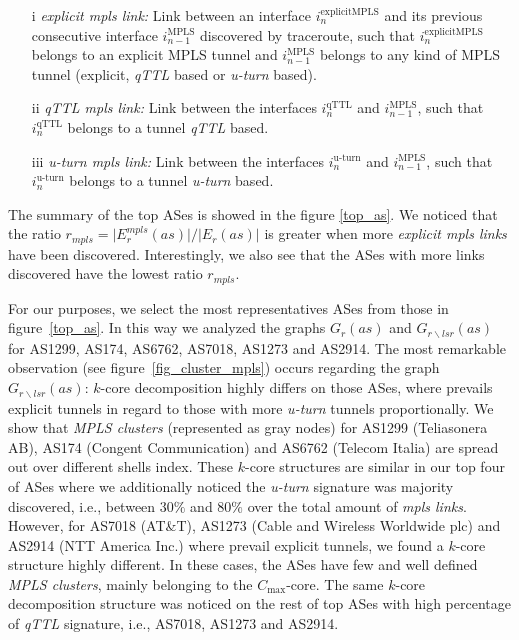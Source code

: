 \begin{itemize}
\item[i] \textit{explicit mpls link:} Link between an interface $i^{\text{explicitMPLS}}_{n}$  and its previous consecutive interface $i^{\text{MPLS}}_{n-1}$ discovered by traceroute, such that $i^{\text{explicitMPLS}}_{n}$ belongs to an explicit MPLS tunnel and $i^{\text{MPLS}}_{n-1}$ belongs to any kind of MPLS tunnel (explicit, \textit{qTTL} based or \textit{u-turn} based).

\item[ii] \textit{qTTL mpls link:} Link between the interfaces $i^{\text{qTTL}}_{n}$  and $i^{\text{MPLS}}_{n-1}$, such that $i^{\text{qTTL}}_{n}$ belongs to a tunnel \textit{qTTL} based.

\item[iii] \textit{u-turn mpls link:} Link between the interfaces $i^{\text{u-turn}}_{n}$  and $i^{\text{MPLS}}_{n-1}$, such that $i^{\text{u-turn}}_{n}$ belongs to a tunnel \textit{u-turn} based.

\end{itemize}

The summary of the top ASes is showed in the figure \ref{top_as}. 
We noticed that the ratio $r_{mpls}= \vert E^{mpls}_{r} (as) \vert /\vert E_{r} (as) \vert $  is greater when more  \textit{explicit mpls links} have been discovered. 
Interestingly, we also see that the ASes with more links discovered have the lowest ratio $r_{mpls}$. 

For our purposes, we select the most representatives ASes from those in figure~\ref{top_as}.
In this way we analyzed the graphs $G_{r}(as)$ and $G_{r\backslash lsr}(as)$ for AS1299, AS174, AS6762, AS7018, AS1273 and AS2914. 
The most remarkable observation (see figure~\ref{fig_cluster_mpls}) occurs regarding the graph $G_{r\backslash lsr}(as)$: $k$-core decomposition highly differs on those ASes, where prevails explicit tunnels in regard to those with more \textit{u-turn} tunnels proportionally. 
We show that \textit{MPLS clusters} (represented as gray nodes) for  AS1299 (Teliasonera AB), AS174 (Congent Communication) and AS6762 (Telecom Italia) are spread out over different shells index. 
These $k$-core structures are similar in our top four of ASes where we additionally noticed  the \textit{u-turn} signature was majority discovered, i.e., between $30\%$ and  $80\%$ over  the total amount of \textit{mpls links}. 
However, for AS7018 (AT\&T), AS1273 (Cable and Wireless Worldwide plc) and AS2914 (NTT America Inc.) %
 where prevail explicit tunnels, we found a $k$-core structure highly different.  
In these cases,  the ASes have few and well defined \textit{MPLS clusters}, mainly belonging to the $C_{\max}$-core. 
The same $k$-core decomposition structure was noticed  on the rest of top ASes with high percentage of \textit{qTTL} signature, i.e., AS7018, AS1273 and AS2914.

